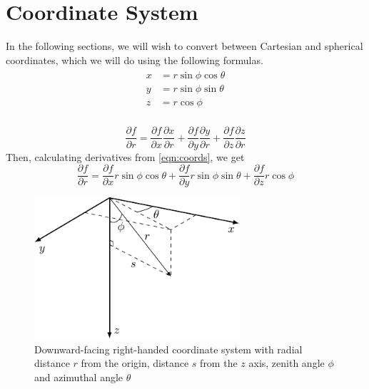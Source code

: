 \section{Coordinate System}
In the following sections, we will wish to convert between Cartesian and spherical coordinates, which we will do using the following formulas.
\begin{align}
	\begin{split}
		x & = r\sin\phi\cos\theta \\
		y & = r\sin\phi\sin\theta \\
		z & = r\cos\phi \\
	\label{eqn:coords}
	\end{split}
\end{align}

\begin{equation}
	\frac{\partial f}{\partial r} 
	=\frac{\partial f}{\partial x}\frac{\partial x}{\partial r} 
	+ \frac{\partial f}{\partial y}\frac{\partial y}{\partial r} 
	+ \frac{\partial f}{\partial z}\frac{\partial z}{\partial r}
\end{equation}
Then, calculating derivatives from \eqref{eqn:coords}, we get
\begin{equation}
	\frac{\partial f}{\partial r} 
	=\frac{\partial f}{\partial x}r\sin\phi\cos\theta
	+ \frac{\partial f}{\partial y}r\sin\phi\sin\theta
	+ \frac{\partial f}{\partial z}r\cos\phi
	\label{eqn:partials}
\end{equation}
\begin{figure}[H]
	\centering
	\includegraphics[width=3in]{3d_coords}
	\caption{Downward-facing right-handed coordinate system with radial distance $r$ from the origin, distance $s$ from the $z$ axis, zenith angle $\phi$ and azimuthal angle $\theta$}
	\label{fig:3dcoords}
\end{figure}

